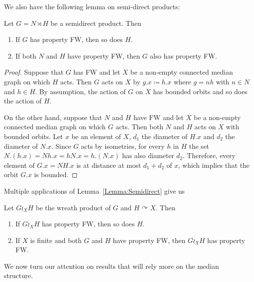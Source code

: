 We also have the following lemma on semi-direct products:
\begin{lem}\label{Lemma:Semidirect}
Let $G=N\rtimes H$ be a semidirect product. Then
\begin{enumerate}
\item
If $G$ has property FW, then so does $H$.
\item
If both $N$ and $H$ have property FW, then $G$ also has property FW.
\end{enumerate}
\end{lem}
\begin{proof}
Suppose that $G$ has FW and let $X$ be a non-empty connected median graph on which $H$ acts.
Then $G$ acts on $X$ by $g.x\coloneqq h.x$ where $g=nh$ with $n\in N$ and $h\in H$.
By assumption, the action of $G$ on $X$ has bounded orbits and so does the action of $H$.

On the other hand, suppose that $N$ and $H$ have FW and let $X$ be a non-empty connected median graph on which $G$ acts.
Then both $N$ and $H$ acts on $X$ with bounded orbits.
Let $x$ be an element of $X$, $d_1$ the diameter of $H.x$ and $d_2$ the diameter of $N.x$.
Since $G$ acts by isometries, for every $h$ in $H$ the set $N.(h.x)=Nh.x=hN.x=h.(N.x)$ has also diameter $d_2$.
Therefore, every element of $G.x=NH.x$ is at distance at most $d_1+d_2$ of $x$, which implies that the orbit $G.x$ is bounded. %
\end{proof}
Multiple applications of Lemma~\ref{Lemma:Semidirect} give us
\begin{cor}\label{Cor:Wreath}
Let $G\wr_X H$ be the wreath product of $G$ and $H\curvearrowright X$.
Then
\begin{enumerate}
\item
If $G\wr_X H$ has property FW, then so does $H$.
\item
If $X$ is finite and both $G$ and $H$ have property FW, then $G\wr_X H$ has property FW.
\end{enumerate}
\end{cor}







We now turn our attention on results that will rely more on the median structure.

